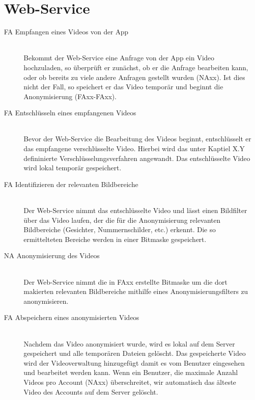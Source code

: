 \section{Web-Service}
\begin{description}
\item[FA Empfangen eines Videos von der App] \hfill \\
Bekommt der Web-Service eine Anfrage von der App ein Video hochzuladen, so überprüft er zunächst, ob er die Anfrage bearbeiten kann, oder ob bereits zu viele andere Anfragen gestellt wurden (NAxx). Ist dies nicht der Fall, so speichert er das Video temporär und beginnt die Anonymisierung (FAxx-FAxx).

\item[FA Entschlüsseln eines empfangenen Videos] \hfill \\
Bevor der Web-Service die Bearbeitung des Videos beginnt, entschlüsselt er das empfangene verschlüsselte Video. Hierbei wird das unter Kaptiel X.Y defininierte Verschlüsselungsverfahren angewandt. Das entschlüsselte Video wird lokal temporär gespeichert.

\item[FA Identifizieren der relevanten Bildbereiche] \hfill \\
Der Web-Service nimmt das entschlüsselte Video und lässt einen Bildfilter über das Video laufen, der die für die Anonymisierung relevanten Bildbereiche (Gesichter, Nummernschilder, etc.) erkennt. Die so ermittelteten Bereiche werden in einer Bitmaske gespeichert.

\item[NA Anonymisierung des Videos] \hfill \\
Der Web-Service nimmt die in FAxx erstellte Bitmaske um die dort makierten relevanten Bildbereiche mithilfe eines Anonymisierungsfilters zu anonymisieren.

\item[FA Abspeichern eines anonymisierten Videos] \hfill \\
Nachdem das Video anonymisiert wurde, wird es lokal auf dem Server gespeichert und alle temporären Dateien gelöscht. Das gespeicherte Video wird der Videoverwaltung hinzugefügt damit es vom Benutzer eingesehen und bearbeitet werden kann. Wenn ein Benutzer, die maximale Anzahl Videos pro Account (NAxx) überschreitet, wir automatisch das älteste Video des Accounts auf dem Server gelöscht.
\end{description}

